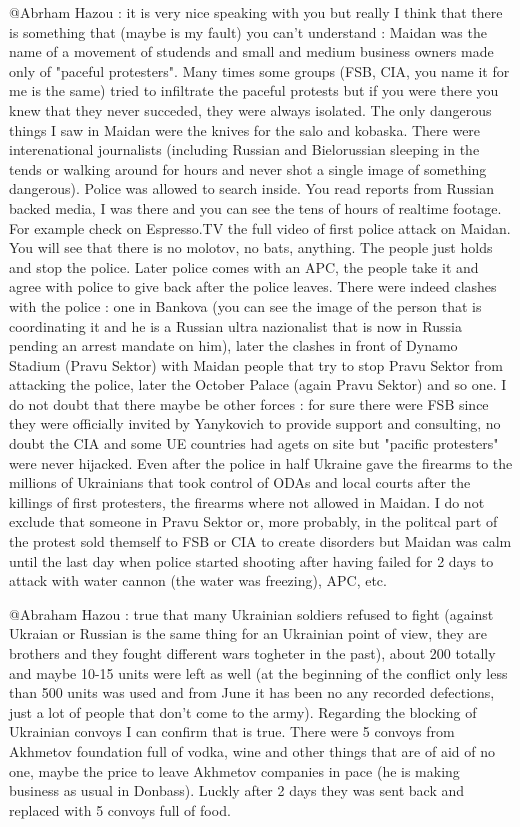 \begin{itemize}
\begin{itemize}
@Abrham Hazou : it is very nice speaking with you but really I think that there
is something that (maybe is my fault) you can't understand : Maidan was the
name of a movement of studends and small and medium business owners made only
of "paceful protesters". Many times some groups (FSB, CIA, you name it for me
is the same) tried to infiltrate the paceful protests but if you were there you
knew that they never succeded, they were always isolated. The only dangerous
things I saw in Maidan were the knives for the salo and kobaska. There were
interenational journalists (including Russian and Bielorussian sleeping in the
tends or walking around for hours and never shot a single image of something
dangerous). Police was allowed to search inside. You read reports from Russian
backed media, I was there and you can see the tens of hours of realtime
footage. For example check on Espresso.TV the full video of first police attack
on Maidan. You will see that there is no molotov, no bats, anything. The people
just holds and stop the police. Later police comes with an APC, the people take
it and agree with police to give back after the police leaves. There were
indeed clashes with the police : one in Bankova (you can see the image of the
person that is coordinating it and he is a Russian ultra nazionalist that is
now in Russia pending an arrest mandate on him), later the clashes in front of
Dynamo Stadium (Pravu Sektor) with Maidan people that try to stop Pravu Sektor
from attacking the police, later the October Palace (again Pravu Sektor) and so
one. I do not doubt that there maybe be other forces : for sure there were FSB
since they were officially invited by Yanykovich to provide support and
consulting, no doubt the CIA and some UE countries had agets on site but
"pacific protesters" were never hijacked. Even after the police in half Ukraine
gave the firearms to the millions of Ukrainians that took control of ODAs and
local courts after the killings of first protesters, the firearms where not
allowed in Maidan. I do not exclude that someone in Pravu Sektor or, more
probably, in the politcal part of the protest sold themself to FSB or CIA to
create disorders but Maidan was calm until the last day when police started
shooting after having failed for 2 days to attack with water cannon (the water
was freezing), APC, etc.


@Abraham Hazou : true that many Ukrainian soldiers refused to fight (against
Ukraian or Russian is the same thing for an Ukrainian point of view, they are
brothers and they fought different wars togheter in the past), about 200
totally and maybe 10-15 units were left as well (at the beginning of the
conflict only less than 500 units was used and from June it has been no any
recorded defections, just a lot of people that don't come to the army).
Regarding the blocking of Ukrainian convoys I can confirm that is true. There
were 5 convoys from Akhmetov foundation full of vodka, wine and other things
that are of aid of no one, maybe the price to leave Akhmetov companies in pace
(he is making business as usual in Donbass). Luckly after 2 days they was sent
back and replaced with 5 convoys full of food.


\end{itemize}
\end{itemize}
